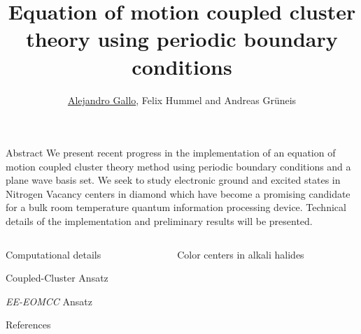 \documentclass[final]{beamer}
\title{
  Equation of motion coupled cluster theory using periodic boundary conditions
}
\author{\underline{Alejandro Gallo}, Felix Hummel and Andreas Gr\"uneis}
\institute[]{
  Technical University of Vienna
}
\begin{document}
\nocite{*}
\begin{frame}[fragile]{}

  \begin{block}{\large Abstract}
    We present recent progress in the implementation of an equation of motion
    coupled cluster theory method using periodic boundary conditions and a plane
    wave basis set.  We seek to study electronic ground and excited states in
    Nitrogen Vacancy centers in diamond which have become a promising candidate
    for a bulk room temperature quantum information processing device. Technical
    details of the implementation and preliminary results will be presented.
  \end{block}
  \begin{columns}[t]
    \begin{column}{.49\linewidth}
      \begin{block}{\large Computational details}
        
      \end{block}
      \begin{block}{\large Coupled-Cluster Ansatz}
        
      \end{block}
      \begin{block}{\large \emph{EE-EOMCC} Ansatz}
        
      \end{block}

      \begin{block}{\large References}
        \printbibliography
      \end{block}

    \end{column}


    \begin{column}{.49\linewidth}
      \begin{block}{\large Color centers in alkali halides}
      \begin{center}


\end{center}
\end{block}
\end{column}
\end{columns}
\end{frame}
\end{document}
